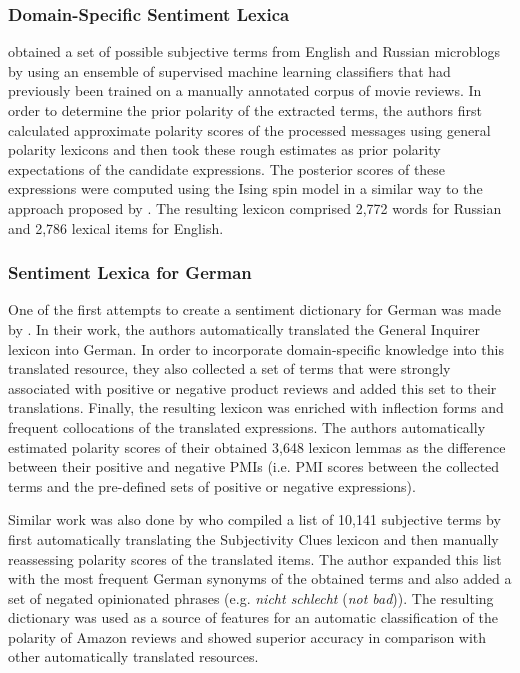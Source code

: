 \subsubsection{Domain-Specific Sentiment Lexica}

\citet{Chetviorkin:14} obtained a set of possible subjective terms
from English and Russian microblogs by using an ensemble of supervised
machine learning classifiers that had previously been trained on a
manually annotated corpus of movie reviews.  In order to determine the
prior polarity of the extracted terms, the authors first calculated
approximate polarity scores of the processed messages using general
polarity lexicons and then took these rough estimates as prior
polarity expectations of the candidate expressions.  The posterior
scores of these expressions were computed using the Ising spin model
in a similar way to the approach proposed by \citet{Takamura:05}.  The
resulting lexicon comprised 2,772 words for Russian and 2,786 lexical
items for English.

\subsubsection{Sentiment Lexica for German}

One of the first attempts to create a sentiment dictionary for German
was made by \citet{Remus:10}.  In their work, the authors
automatically translated the General Inquirer lexicon \citep{Stone:66}
into German.  In order to incorporate domain-specific knowledge into
this translated resource, they also collected a set of terms that were
strongly associated with positive or negative product reviews and
added this set to their translations.  Finally, the resulting lexicon
was enriched with inflection forms and frequent collocations of the
translated expressions.  The authors automatically estimated polarity
scores of their obtained 3,648 lexicon lemmas as the difference
between their positive and negative PMIs (i.e. PMI scores between the
collected terms and the pre-defined sets of positive or negative
expressions).

Similar work was also done by \citet{Waltinger:10} who compiled a list
of 10,141 subjective terms by first automatically translating the
Subjectivity Clues lexicon \citep{Wilson:05} and then manually
reassessing polarity scores of the translated items.  The author
expanded this list with the most frequent German synonyms of the
obtained terms and also added a set of negated opinionated phrases
(e.g. \emph{nicht schlecht} (\emph{not bad})).  The resulting
dictionary was used as a source of features for an automatic
classification of the polarity of Amazon reviews and showed superior
accuracy in comparison with other automatically translated resources.

